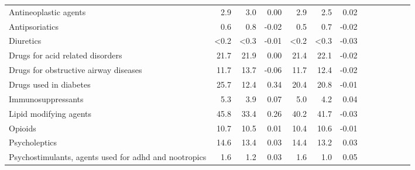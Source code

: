 \documentclass[11pt,]{article}
\begin{document}
\begin{longtable}{lrrrrrrrrrrrr}
      Antineoplastic agents &  2.9 &  3.0 &  0.00 &  2.9 &  2.5 &  0.02 \\ 
      Antipsoriatics &  0.6 &  0.8 & -0.02 &  0.5 &  0.7 & -0.02 \\ 
      Diuretics & <0.2 & <0.3 & -0.01 & <0.2 & <0.3 & -0.03 \\ 
      Drugs for acid related disorders & 21.7 & 21.9 &  0.00 & 21.4 & 22.1 & -0.02 \\ 
      Drugs for obstructive airway diseases & 11.7 & 13.7 & -0.06 & 11.7 & 12.4 & -0.02 \\ 
      Drugs used in diabetes & 25.7 & 12.4 &  0.34 & 20.4 & 20.8 & -0.01 \\ 
      Immunosuppressants &  5.3 &  3.9 &  0.07 &  5.0 &  4.2 &  0.04 \\ 
      Lipid modifying agents & 45.8 & 33.4 &  0.26 & 40.2 & 41.7 & -0.03 \\ 
      Opioids & 10.7 & 10.5 &  0.01 & 10.4 & 10.6 & -0.01 \\ 
      Psycholeptics & 14.6 & 13.4 &  0.03 & 14.4 & 13.2 &  0.03 \\ 
      Psychostimulants, agents used for adhd and nootropics &  1.6 &  1.2 &  0.03 &  1.6 &  1.0 &  0.05 \\ 
   \bottomrule\end{longtable}
\clearpage
{}
\end{document}
